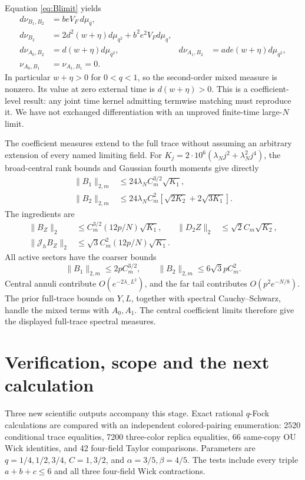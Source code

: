 \documentclass[11pt,a4paper]{article}
\newcommand{\Jh}{\mathcal J_h}
\begin{document}
Equation \eqref{eq:Blimit} yields
\begin{align}
 d\nu_{B_1,B_2}&=b e V_F\,d\mu_q,\\
 d\nu_{B_2}&=2d^2(w+\eta)d\mu_{q^2}+b^2e^2V_Fd\mu_q,\\
 d\nu_{A_0,B_2}&=d(w+\eta)d\mu_{q^2},&
 d\nu_{A_1,B_2}&=ad e(w+\eta)d\mu_{q^2},\\
 \nu_{A_0,B_1}&=\nu_{A_1,B_1}=0.
\end{align}
In particular $w+\eta>0$ for $0<q<1$, so the second-order mixed
measure is nonzero. Its value at zero external time is
$d(w+\eta)>0$. This is a coefficient-level result: any joint
time kernel admitting termwise matching must reproduce it.
We have not exchanged differentiation with an unproved
finite-time large-$N$ limit.

The coefficient measures extend to the full trace without assuming
an arbitrary extension of every named limiting field. For
$K_j=2\cdot10^6(\lambda_Nj^2+\lambda_N^2j^4)$, the broad-central
rank bounds and Gaussian fourth moments give directly
\begin{align}
 \|B_1\|_{2,m}&\le24\lambda_N C_m^{3/2}\sqrt{K_1},\\
 \|B_2\|_{2,m}&\le24\lambda_N C_m^2
                       [\sqrt{2K_2}+2\sqrt{3K_1}].
\end{align}
The ingredients are
\begin{align*}
 \|B_Z\|_2&\le C_m^{3/2}(12p/N)\sqrt{K_1},&
 \|D_2Z\|_2&\le\sqrt2 C_m\sqrt{K_2},\\
 \|\Jh B_Z\|_2&\le\sqrt3 C_m^2(12p/N)\sqrt{K_1}.
\end{align*}
All active sectors have the coarser bounds
\begin{equation}
 \|B_1\|_{2,m}\le2pC_m^{3/2},\qquad
 \|B_2\|_{2,m}\le6\sqrt3 pC_m^2.
\end{equation}
Central annuli contribute $O(e^{-2\lambda_-L^2})$, and the far
tail contributes $O(p^2e^{-N/8})$. The prior full-trace bounds on
$Y,L$, together with spectral Cauchy--Schwarz, handle the mixed
terms with $A_0,A_1$. The central coefficient limits therefore give
the displayed full-trace spectral measures.

\newpage
\section{Verification, scope and the next calculation}
Three new scientific outputs accompany this stage.
Exact rational $q$-Fock calculations are compared with an independent
colored-pairing enumeration: 2520 conditional trace equalities,
7200 three-color replica equalities, 66 same-copy OU Wick identities,
and 42 four-field Taylor comparisons. Parameters are
$q=1/4,1/2,3/4$, $C=1,3/2$, and $\alpha=3/5,\beta=4/5$.
The tests include every triple $a+b+c\le6$ and all three
four-field Wick contractions.
\end{document}
